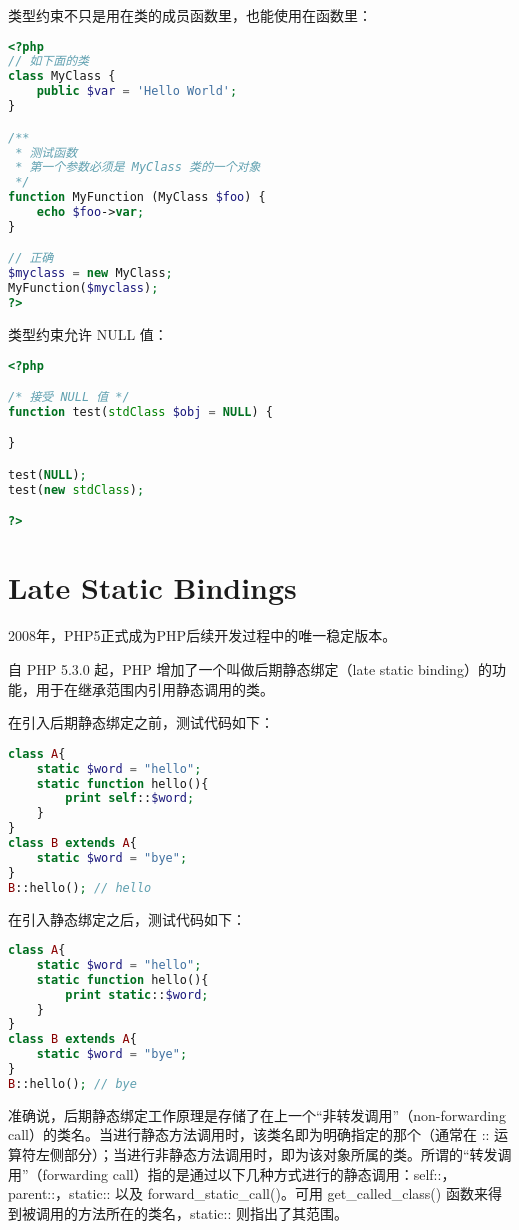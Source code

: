 类型约束不只是用在类的成员函数里，也能使用在函数里：


\begin{lstlisting}[language=PHP]
<?php
// 如下面的类
class MyClass {
    public $var = 'Hello World';
}

/**
 * 测试函数
 * 第一个参数必须是 MyClass 类的一个对象
 */
function MyFunction (MyClass $foo) {
    echo $foo->var;
}

// 正确
$myclass = new MyClass;
MyFunction($myclass);
?>
\end{lstlisting}

类型约束允许 NULL 值：


\begin{lstlisting}[language=PHP]
<?php

/* 接受 NULL 值 */
function test(stdClass $obj = NULL) {

}

test(NULL);
test(new stdClass);

?>
\end{lstlisting}


\chapter{Late Static Bindings}

2008年，PHP5正式成为PHP后续开发过程中的唯一稳定版本。

自 PHP 5.3.0 起，PHP 增加了一个叫做后期静态绑定（late static binding）的功能，用于在继承范围内引用静态调用的类。

在引入后期静态绑定之前，测试代码如下：




\begin{lstlisting}[language=PHP]
class A{
	static $word = "hello";
	static function hello(){
		print self::$word;
	}
}
class B extends A{
	static $word = "bye"; 
}
B::hello(); // hello
\end{lstlisting}

在引入静态绑定之后，测试代码如下：


\begin{lstlisting}[language=PHP]
class A{
	static $word = "hello";
	static function hello(){
		print static::$word;
	}
}
class B extends A{
	static $word = "bye";
}
B::hello(); // bye
\end{lstlisting}


准确说，后期静态绑定工作原理是存储了在上一个“非转发调用”（non-forwarding call）的类名。当进行静态方法调用时，该类名即为明确指定的那个（通常在 :: 运算符左侧部分）；当进行非静态方法调用时，即为该对象所属的类。所谓的“转发调用”（forwarding call）指的是通过以下几种方式进行的静态调用：self::，parent::，static:: 以及 forward\_static\_call()。可用 get\_called\_class() 函数来得到被调用的方法所在的类名，static:: 则指出了其范围。

